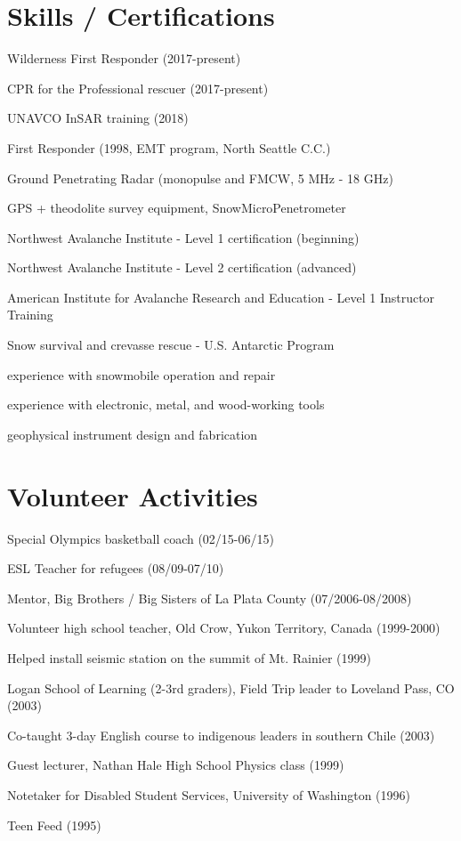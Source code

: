 \documentclass[11pt]{article}
\renewenvironment{itemize}{
  \begin{list}{}{
    \setlength{\leftmargin}{1.5em}
    \setlength{\itemsep}{0pt}
    \setlength{\parskip}{0pt}
  }
}{
  \end{list}
}
\begin{document}
\section*{Skills / Certifications}
\begin{itemize}
\item Wilderness First Responder (2017-present)
\item CPR for the Professional rescuer (2017-present)
\item UNAVCO InSAR training (2018)
\item First Responder (1998, EMT program, North Seattle C.C.)
\item Ground Penetrating Radar (monopulse and FMCW, 5 MHz - 18 GHz)
\item GPS + theodolite survey equipment, SnowMicroPenetrometer
\item Northwest Avalanche Institute - Level 1 certification (beginning)
\item Northwest Avalanche Institute - Level 2 certification (advanced)
\item American Institute for Avalanche Research and Education - Level 1 Instructor Training
\item Snow survival and crevasse rescue - U.S. Antarctic Program
\item experience with snowmobile operation and repair
\item experience with electronic, metal, and wood-working tools
\item geophysical instrument design and fabrication
\end{itemize}

\section*{Volunteer Activities}
\begin{itemize}
\item Special Olympics basketball coach (02/15-06/15)
\item ESL Teacher for refugees (08/09-07/10)
\item Mentor, Big Brothers / Big Sisters of La Plata County (07/2006-08/2008)
\item Volunteer high school teacher, Old Crow, Yukon Territory, Canada (1999-2000)
\item Helped install seismic station on the summit of Mt. Rainier (1999)
\item Logan School of Learning (2-3rd graders), Field Trip leader to Loveland Pass, CO (2003)
\item Co-taught 3-day English course to indigenous leaders in southern Chile (2003)
\item Guest lecturer, Nathan Hale High School Physics class (1999)
\item Notetaker for Disabled Student Services, University of Washington (1996)
\item Teen Feed (1995)
\end{itemize}
\end{document}
